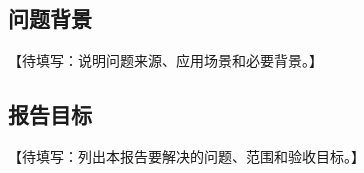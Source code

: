 \subsection{问题背景}\label{sec:problem-background}

【待填写：说明问题来源、应用场景和必要背景。】

\subsection{报告目标}\label{sec:report-objectives}

【待填写：列出本报告要解决的问题、范围和验收目标。】
